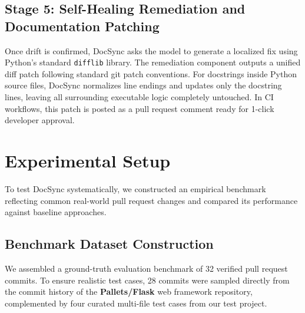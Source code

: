 \documentclass[12pt,onecolumn,draftclsnofoot]{IEEEtran}
\begin{document}
\subsection{Stage 5: Self-Healing Remediation and Documentation Patching}
Once drift is confirmed, DocSync asks the model to generate a localized fix using Python's standard \texttt{difflib} library. The remediation component outputs a unified diff patch following standard git patch conventions. For docstrings inside Python source files, DocSync normalizes line endings and updates only the docstring lines, leaving all surrounding executable logic completely untouched. In CI workflows, this patch is posted as a pull request comment ready for 1-click developer approval.

\section{Experimental Setup}
To test DocSync systematically, we constructed an empirical benchmark reflecting common real-world pull request changes and compared its performance against baseline approaches.

\subsection{Benchmark Dataset Construction}
We assembled a ground-truth evaluation benchmark of 32 verified pull request commits. To ensure realistic test cases, 28 commits were sampled directly from the commit history of the \textbf{Pallets/Flask} web framework repository, complemented by four curated multi-file test cases from our test project.
\end{document}
